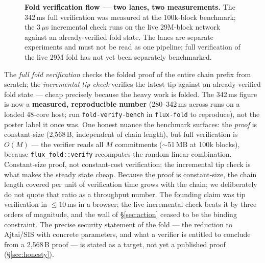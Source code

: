\documentclass[10pt,a4paper]{article}
\newcommand{\measured}[1]{\textcolor{sigilcyan}{\textbf{#1}}}
\begin{document}
\begin{figure}[htbp]
\centering
{}
\caption{\small\textbf{Fold verification flow — two lanes, two measurements.} The
342\,ms full verification was measured at the 100k-block benchmark; the 3\,$\mu$s
incremental check runs on the live 29M-block network against an already-verified fold
state. The lanes are separate experiments and must not be read as one pipeline; full
verification of the live 29M fold has not yet been separately benchmarked.}
\label{fig:foldflow}
\end{figure}

The \emph{full fold verification} checks the folded proof of the entire chain prefix
from scratch; the \emph{incremental tip check} verifies the latest tip against an
already-verified fold state — cheap precisely because the heavy work is folded. The
342\,ms figure is now a \measured{measured, reproducible number} (280--342\,ms across
runs on a loaded 48-core host; run \texttt{fold-verify-bench} in \texttt{flux-fold} to
reproduce), not the poster label it once was. One honest nuance the benchmark surfaces:
the \emph{proof} is constant-size (2{,}568\,B, independent of chain length), but full
verification is \emph{$O(M)$} — the verifier reads all $M$ commitments ($\sim$51\,MB at
100k blocks), because \texttt{flux\_fold::verify} recomputes the random linear
combination. Constant-size proof, not constant-cost verification; the incremental tip
check is what makes the steady state cheap. Because the proof is constant-size, the chain
length covered per unit of verification time grows with the chain; we deliberately do not
quote that ratio as a throughput number. The founding claim was tip verification in
$\le$10\,ms in a browser; the live incremental check beats it by three orders of
magnitude, and the wall of \S\ref{sec:action} ceased to be the binding constraint. The
precise security statement of the fold — the reduction to Ajtai/SIS with concrete
parameters, and what a verifier is entitled to conclude from a 2{,}568\,B proof — is
stated as a target, not yet a published proof (\S\ref{sec:honesty}).
\end{document}
